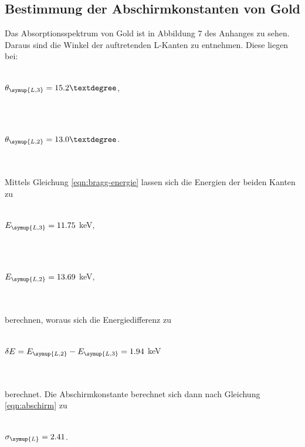         \subsection{Bestimmung der Abschirmkonstanten von Gold}
        Das Absorptionsspektrum von Gold ist in Abbildung 7 des Anhanges zu sehen. Daraus sind die Winkel der auftretenden L-Kanten zu entnehmen.
        Diese liegen bei:
        \\ \\
        \centerline{$\theta_{\symup{L,3}} = 15.2°$,}
        \\ \\
        \centerline{$\theta_{\symup{L,2}} = 13.0°$.}
        \\ \\
        Mittels Gleichung \eqref{eqn:bragg-energie} lassen sich die Energien der beiden Kanten zu
        \\ \\
        \centerline{$E_{\symup{L,3}} = 11.75$ keV,}
        \\ \\
        \centerline{$E_{\symup{L,2}} = 13.69$ keV,}
        \\ \\
        berechnen, woraus sich die Energiedifferenz zu
        \\ \\
        \centerline{$\delta E = E_{\symup{L,2}} - E_{\symup{L,3}} = 1.94$ keV}
        \\ \\
        berechnet. Die Abschirmkonstante berechnet sich dann nach Gleichung \eqref{eqn:abschirm} zu 
        \\ \\
        \centerline{$\sigma_{\symup{L}} = 2.41$.}
        \\ \\
        



